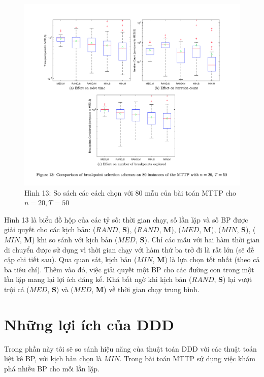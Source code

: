 \documentclass[../main.tex]{subfiles}
\begin{document}
\begin{figure}
\centering
\includegraphics{images/Figure13.png}
\caption{Hình 13: So sách các cách chọn với 80 mẫu của bài toán MTTP cho
\(n=20, T=50\)}
\end{figure}

Hình 13 là biểu đồ hộp của các tỷ số: thời gian chạy, số lần lặp và số
BP được giải quyết cho các kịch bản: (\(RAND\), \textbf{S}), (\(RAND\),
\textbf{M}), (\(MED\), \textbf{M}), (\(MIN\), \textbf{S}), (\(MIN\),
\textbf{M}) khi so sánh với kịch bản (\(MED\), \textbf{S}). Chỉ các mẫu
với hai hàm thời gian di chuyển được sử dụng vì thời gian chạy với hàm
thứ ba trở đi là rất lớn (sẽ đề cập chi tiết sau). Qua quan sát, kịch
bản (\(MIN\), \textbf{M}) là lựa chọn tốt nhất (theo cả ba tiêu chí).
Thêm vào đó, việc giải quyết một BP cho các đường con trong một lần lặp
mang lại lợi ích đáng kể. Khá bất ngờ khi kịch bản (\(RAND\),
\textbf{S}) lại vượt trội cả (\(MED\), \textbf{S}) và (\(MED\),
\textbf{M}) về thời gian chạy trung bình.

\section{Những lợi ích của
DDD}\label{nhux1eefng-lux1ee3i-uxedch-cux1ee7a-ddd}

Trong phần này tôi sẽ so sánh hiệu năng của thuật toán DDD với các thuật
toán liệt kê BP, với kịch bản chọn là \(MIN\). Trong bài toán MTTP sử
dụng việc khám phá nhiều BP cho mỗi lần lặp.
\end{document}
